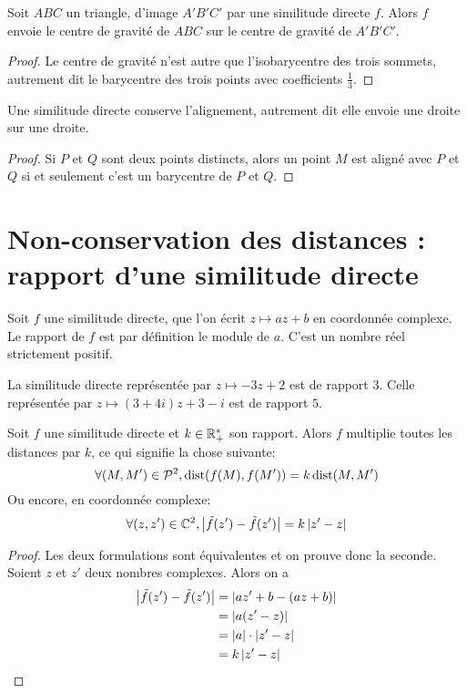 \begin{corollaire}
Soit $ABC$ un triangle, d'image $A'B'C'$ par une similitude directe $f$. Alors $f$ envoie le centre de gravité de $ABC$ sur le centre de gravité de $A'B'C'$.
\end{corollaire}
\begin{proof}
Le centre de gravité n'est autre que l'isobarycentre des trois sommets, autrement dit le barycentre des trois points avec coefficients $\frac13$.
\end{proof}

\begin{corollaire}
Une similitude directe conserve l'alignement, autrement dit elle envoie une droite sur une droite.
\end{corollaire}
\begin{proof}
Si $P$ et $Q$ sont deux points distincts, alors un point $M$ est aligné avec $P$ et $Q$ si et seulement c'est un barycentre de $P$ et $Q$.
\end{proof}


\section{Non-conservation des distances : rapport d'une similitude directe}

\begin{definition}
Soit $f$ une similitude directe, que l'on écrit $z\mapsto az+b$ en coordonnée complexe. Le rapport de $f$ est par définition le module de $a$. C'est un nombre réel strictement positif.
\end{definition}

\begin{exemple}
La similitude directe représentée par $z\mapsto -3z+2$ est de rapport $3$. Celle représentée par $z\mapsto (3+4i)z+3-i$ est de rapport $5$.
\end{exemple}

\begin{proposition}
Soit $f$ une similitude directe et $k\in\mathbb{R}_+^*$ son rapport. Alors $f$ \og multiplie toutes les distances par $k$\fg, ce qui signifie la chose suivante:
\[ \forall (M, M') \in\mathcal P^2, \operatorname{dist}(f(M),f(M'))=k\operatorname{dist}(M,M')\]
Ou encore, en coordonnée complexe:
\[ \forall (z, z')\in\mathbb{C}^2, \left\lvert\tilde f(z')- \tilde f(z')\right\rvert = k\left\lvert z'-z\right\rvert\] 
\end{proposition}
\begin{proof}
Les deux formulations sont équivalentes et on prouve donc la seconde. Soient $z$ et $z'$ deux nombres complexes. Alors on a 
\begin{align*}
\left\lvert\tilde f(z')- \tilde f(z')\right\rvert
&= \left\lvert az'+b-(az+b)\right\rvert\\
&= \left\lvert a(z'-z)\right\rvert\\
&=\left\lvert a\right\rvert\cdot\left\lvert z'-z\right\rvert\\
&= k\left\lvert z'-z\right\rvert
\end{align*}
\end{proof}

